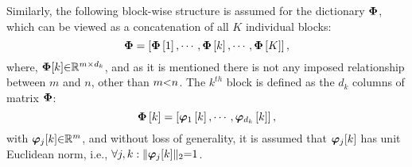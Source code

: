 Similarly, the following block-wise structure is assumed for the dictionary $\boldsymbol{\Phi}$, which can be viewed as a concatenation of all $K$ individual blocks:
\begin{equation*}
\label{eq:Phi Structure-whole}
\boldsymbol{\Phi} = \left[ \boldsymbol{\Phi}\left[ 1 \right],  \cdots, \boldsymbol{\Phi}\left[ k \right], \cdots, \boldsymbol{\Phi}\left[ K \right] \right],
\end{equation*}
where, $\boldsymbol{\Phi}[k] {\in} \mathbb{R}^{m {\times} d_k}$, and as it is mentioned there is not any imposed relationship between $m$ and $n$, other than $m {<} n$.   
The $k^{th}$ block is defined as the $d_k$ columns of matrix $\boldsymbol{\Phi}$:
\begin{equation*}
\label{eq:Phi Structure-block}
\boldsymbol{\Phi} \left[ k \right] = \left[ \boldsymbol{\varphi}_1\left[ k \right], \cdots, \boldsymbol{\varphi}_{d_k}\left[ k \right] \right],
\end{equation*}
with $\boldsymbol{\varphi}_{j}[k] {\in} \mathbb{R}^{m}$, and without loss of generality, it is assumed that $\boldsymbol{\varphi}_{j}[k]$ has unit Euclidean norm, i.e., $\forall j, k : \Vert \boldsymbol{\varphi}_{j}[k] \Vert_2 {=} 1$.